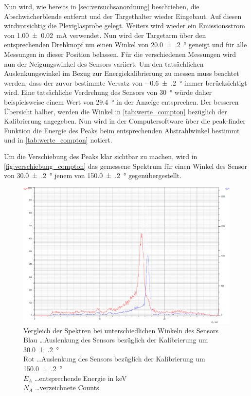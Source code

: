 \documentclass[12pt,english,ngerman]{scrartcl}
\begin{document}
Nun wird, wie bereits in \autoref{sec:versuchsanordnung} beschrieben, die Abschwächerblende entfernt und
der Targethalter wieder Eingebaut. Auf diesen wirdvorsichtig die Plexiglasprobe gelegt.
Weiters wird wieder ein Emissionsstrom von \SI{1.00(2)}{mA} verwendet.
Nun wird der Targetarm über den entsprechenden Drehknopf um einen Winkel von \SI{20.0(2)}{\degree} geneigt und 
für alle Messungen in dieser Position belassen.
Für die verschiedenen Messungen wird nun der Neigungswinkel des Sensors variiert. Um den tatsächlichen Auslenkungswinkel
im Bezug zur Energiekalibrierung zu messen muss beachtet werden, dass der zuvor bestimmte Versatz von \SI{-0.6(2)}{\degree}
immer berücksichtigt wird. Eine tatsächliche Verdrehung des Sensors von \SI{30}{\degree} würde daher beispielsweise
einem Wert von \SI{29.4}{\degree} in der Anzeige entsprechen. Der besseren Übersicht halber, werden die Winkel in 
\autoref{tab:werte_compton} bezüglich der Kalibrierung angegeben. Nun wird in der Computersoftware über die peak-finder
Funktion die Energie des Peaks beim entsprechenden Abstrahlwinkel bestimmt und in \autoref{tab:werte_compton} notiert.



Um die Verschiebung des Peaks klar sichtbar zu machen, wird in \autoref{fig:verschiebung_compton} das gemessene Spektrum 
für einen Winkel des Sensor von \SI{30.0(2)}{\degree} jenem von \SI{150.0(2)}{\degree} gegenübergestellt.

\begin{figure}[H]
	\begin{center}
		\includegraphics[width =\textwidth]{./figures/compton/vergleich.png}
	\end{center}
	\caption[Aufgezeichnetes Kalibrierungsspektrum mit Interface]
	{\footnotesize Vergleich der Spektren bei unterschiedlichen Winkeln des Sensors \\
	Blau \dots Auslenkung des Sensors bezüglich der Kalibrierung um \SI{30.0(2)}{\degree}\\
	Rot \dots Auslenkung des Sensors bezüglich der Kalibrierung um \SI{150.0(2)}{\degree}\\
	$E_A$ \dots entsprechende Energie in keV\\
	$N_A$ \dots verzeichnete Counts
	}\label{fig:verschiebung_compton}
\end{figure}
\end{document}
